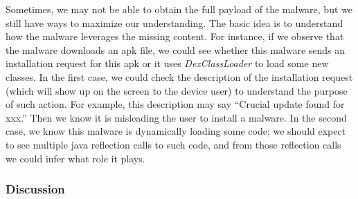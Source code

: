 Sometimes, we may not be able to obtain the full payload of the malware,
but we still have ways to maximize our understanding.
The basic idea is to understand how the malware leverages the missing content.
For instance, if we observe that the malware downloads an apk file, we could see
whether this malware sends an installation request for this apk or it uses \emph{DexClassLoader}
to load some new classes. In the first case, we could check the description of the installation
request (which will show up on the screen to the device user) to understand the purpose of such
action. For example, this description may say ``Crucial update found for xxx.'' Then we know it 
is misleading the user to install a malware.
In the second case, we know this malware is dynamically loading some code; we should expect to see
multiple java reflection calls to such code, and from those reflection calls we could infer what
role it plays.



\subsubsection{Discussion}

